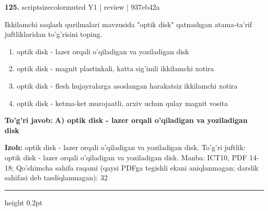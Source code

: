 \documentclass[10pt,a4paper]{article}
\begin{document}
{\bfseries\sffamily\color{ink} 125.} {scriptsizecolor{muted} Y1 | review | 937eb42a}
\par
Ikkilamchi saqlash qurilmalari mavzusida "optik disk" qatnashgan atama-ta'rif juftliklaridan to'g'risini toping.
\begin{enumerate}[label=\Alph*),leftmargin=9mm]
\item optik disk - lazer orqali o'qiladigan va yoziladigan disk
\item optik disk - magnit plastinkali, katta sig'imli ikkilamchi xotira
\item optik disk - flesh hujayralarga asoslangan harakatsiz ikkilamchi xotira
\item optik disk - ketma-ket murojaatli, arxiv uchun qulay magnit vosita
\end{enumerate}
\begin{tcolorbox}[enhanced,breakable,colback=teal!4,colframe=teal!60!black,boxrule=0.45pt,arc=1.2mm,left=2.7mm,right=2.7mm,top=1.8mm,bottom=1.8mm,before skip=2mm,after skip=2mm]
{\bfseries\sffamily\color{teal}To'g'ri javob:} \textbf{A) optik disk - lazer orqali o'qiladigan va yoziladigan disk}
\par\smallskip
{\bfseries Izoh:} optik disk - lazer orqali o'qiladigan va yoziladigan disk. To'g'ri juftlik: optik disk - lazer orqali o'qiladigan va yoziladigan disk. Manba: ICT10, PDF 14-18; Qo'shimcha sahifa raqami (qaysi PDFga tegishli ekani aniqlanmagan; darslik sahifasi deb tasdiqlanmagan): 32
\end{tcolorbox}
\vspace{2mm}\hrule height 0.2pt\vspace{3mm}
\end{document}
